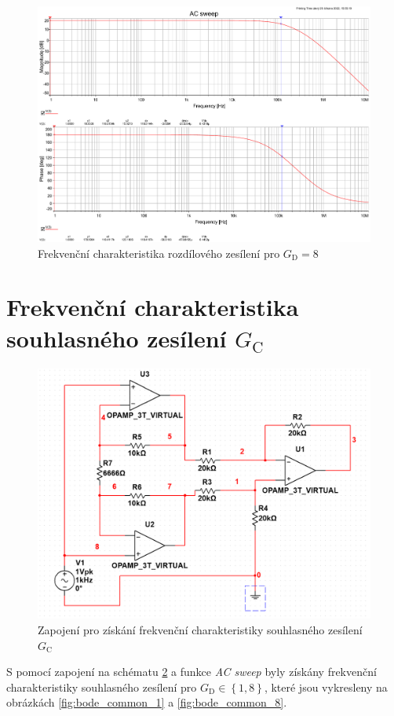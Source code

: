 \documentclass[twoside]{article}
\begin{document}
\begin{figure}[h!]
    \centering
    \includegraphics[width=0.92\linewidth]{bode_diff_8.pdf}
    \caption{Frekvenční charakteristika rozdílového zesílení pro $G_\text{D} = 8$}
    \label{fig:bode_diff_8}
\end{figure}

\newpage
\section{Frekvenční charakteristika souhlasného zesílení $G_\text{C}$}

\begin{figure}[h!]
    \centering
    \includegraphics[width=0.8\linewidth]{bode_common_schema.png}
    \caption{Zapojení pro získání frekvenční charakteristiky souhlasného zesílení $G_\text{C}$}
    \label{fig:schema_common}
\end{figure}

S pomocí zapojení na schématu \ref{fig:schema_common} a funkce \textit{AC sweep} byly
získány frekvenční charakteristiky souhlasného zesílení pro $G_\text{D} \in \left\{ 1,8 \right\}$,
které jsou vykresleny na obrázkách \ref{fig:bode_common_1} a \ref{fig:bode_common_8}.
\end{document}
